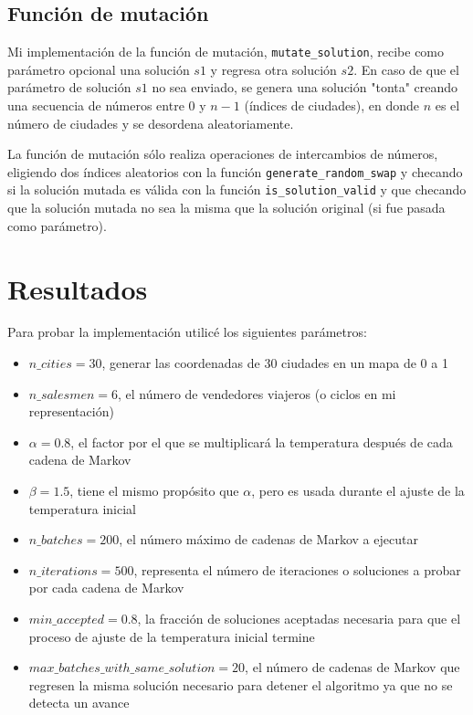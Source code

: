 \documentclass[sigconf,authorversion,nonacm]{acmart}
\begin{document}
\subsection{Función de mutación}
Mi implementación de la función de mutación, \texttt{mutate\_solution}, recibe como parámetro opcional una solución $s1$ y regresa otra solución $s2$.
En caso de que el parámetro de solución $s1$ no sea enviado, se genera una solución "tonta" creando una secuencia de números entre $0$ y $n-1$ (índices de ciudades), en donde $n$ es el número de ciudades y se desordena aleatoriamente.

La función de mutación sólo realiza operaciones de intercambios de números, eligiendo dos índices aleatorios con la función \texttt{generate\_random\_swap} y checando si la solución mutada es válida con la función \texttt{is\_solution\_valid} y que checando que la solución mutada no sea la misma que la solución original (si fue pasada como parámetro).


\section{Resultados}
Para probar la implementación utilicé los siguientes parámetros:
\begin{itemize}
  \item $n\_cities = 30$, generar las coordenadas de 30 ciudades en un mapa de 0 a 1
  \item $n\_salesmen = 6$, el número de vendedores viajeros (o ciclos en mi representación)
  \item $\alpha = 0.8$, el factor por el que se multiplicará la temperatura después de cada cadena de Markov
  \item $\beta = 1.5$, tiene el mismo propósito que $\alpha$, pero es usada durante el ajuste de la temperatura inicial
  \item $n\_batches = 200$, el número máximo de cadenas de Markov a ejecutar
  \item $n\_iterations = 500$, representa el número de iteraciones o soluciones a probar por cada cadena de Markov
  \item $min\_accepted = 0.8$, la fracción de soluciones aceptadas necesaria para que el proceso de ajuste de la temperatura inicial termine
  \item $max\_batches\_with\_same\_solution = 20$, el número de cadenas de Markov que regresen la misma solución necesario para detener el algoritmo ya que no se detecta un avance
\end{itemize}
\end{document}
